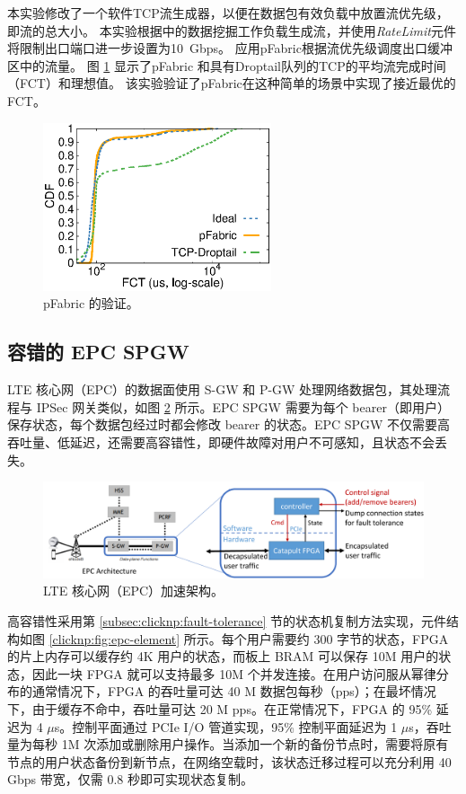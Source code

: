 本实验修改了一个软件TCP流生成器\cite {mqecn}，以便在数据包有效负载中放置流优先级，即流的总大小。
本实验根据\cite {pfabric}中的数据挖掘工作负载生成流，并使用\textit {RateLimit}元件将限制出口端口进一步设置为10~Gbps。
应用pFabric根据流优先级调度出口缓冲区中的流量。
图 \ref{clicknp:fig:pfabric} 显示了pFabric 和具有Droptail队列的TCP的平均流完成时间（FCT）和理想值。
该实验验证了pFabric在这种简单的场景中实现了接近最优的FCT。

\begin{figure}[htbp]
	\centering
	\includegraphics[width=0.6\textwidth]{eval/pfabric}
	\caption{pFabric 的验证。}
	\label{clicknp:fig:pfabric}
\end{figure}

\subsection{容错的 EPC SPGW}

LTE 核心网（EPC）的数据面使用 S-GW 和 P-GW 处理网络数据包，其处理流程与 IPSec 网关类似，如图 \ref{clicknp:fig:epc-arch} 所示。EPC SPGW 需要为每个 bearer（即用户）保存状态，每个数据包经过时都会修改 bearer 的状态。EPC SPGW 不仅需要高吞吐量、低延迟，还需要高容错性，即硬件故障对用户不可感知，且状态不会丢失。

\begin{figure}[htbp]
	\centering
	\includegraphics[width=1.0\textwidth]{image/EPC_arch}
	\caption{LTE 核心网（EPC）加速架构。}
	\label{clicknp:fig:epc-arch}
\end{figure}


高容错性采用第 \ref{subsec:clicknp:fault-tolerance} 节的状态机复制方法实现，元件结构如图 \ref{clicknp:fig:epc-element} 所示。每个用户需要约 300 字节的状态，FPGA 的片上内存可以缓存约 4K 用户的状态，而板上 BRAM 可以保存 10M 用户的状态，因此一块 FPGA 就可以支持最多 10M 个并发连接。在用户访问服从幂律分布的通常情况下，FPGA 的吞吐量可达 40 M 数据包每秒（pps）；在最坏情况下，由于缓存不命中，吞吐量可达 20 M pps。在正常情况下，FPGA 的 95\% 延迟为 4 $\mu$s。控制平面通过 PCIe I/O 管道实现，95\% 控制平面延迟为 1 $\mu$s，吞吐量为每秒 1M 次添加或删除用户操作。当添加一个新的备份节点时，需要将原有节点的用户状态备份到新节点，在网络空载时，该状态迁移过程可以充分利用 40 Gbps 带宽，仅需 0.8 秒即可实现状态复制。


